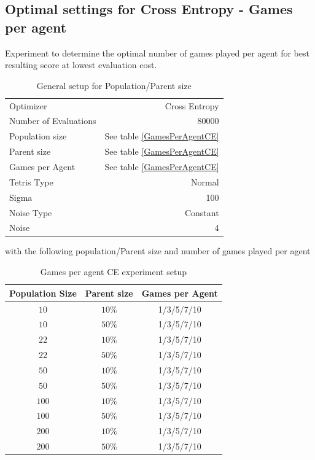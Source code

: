 \clearpage



\subsection{Optimal settings for Cross Entropy - Games per agent}
Experiment to determine the optimal number of games played per agent for best resulting score at lowest evaluation cost.

\begin{table}[h]
\centering
\caption{General setup for Population/Parent size}
\begin{tabular}{l r}
Optimizer & Cross Entropy\\
Number of Evaluations & 80000\\
Population size & See table \ref{GamesPerAgentCE}\\
Parent size & See table \ref{GamesPerAgentCE}\\
Games per Agent & See table \ref{GamesPerAgentCE}\\
Tetris Type & Normal\\
\hline
Sigma & 100\\
Noise Type & Constant\\
Noise & 4
\end{tabular}
\end{table}

with the following population/Parent size and number of games played per agent

\begin{table}[H]
\centering
\begin{tabular}{c c c}
Population Size & Parent size & Games per Agent\\
\hline
$10$ & $10\%$ & 1/3/5/7/10\\
$10$ & $50\%$ & 1/3/5/7/10\\
$22$ & $10\%$ & 1/3/5/7/10\\
$22$ & $50\%$ & 1/3/5/7/10\\
$50$ & $10\%$ & 1/3/5/7/10\\
$50$ & $50\%$ & 1/3/5/7/10\\
$100$ & $10\%$  & 1/3/5/7/10\\
$100$ & $50\%$ & 1/3/5/7/10\\
$200$ & $10\%$ & 1/3/5/7/10\\
$200$ & $50\%$ & 1/3/5/7/10
\end{tabular}
\caption{Games per agent CE experiment setup\label{GamesPerAgentCEAppendix}}
\end{table}


